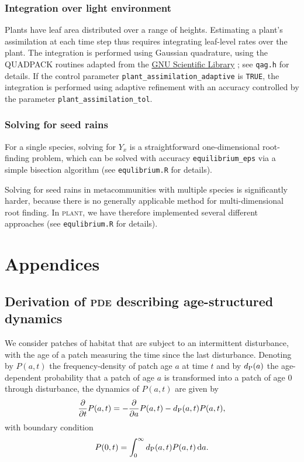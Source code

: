 \documentclass[10pt,twoside]{article}
\newcommand{\plant}{\textsc{plant}}
\begin{document}
\subsubsection{Integration over light
environment}\label{integrating-over-light-environment}

Plants have leaf area distributed over a range of heights. Estimating
a plant's assimilation at each time step thus requires integrating
leaf-level rates over the plant. The integration is performed using
Gaussian quadrature, using the QUADPACK routines \citep{Piessens-1983}
adapted from the \href{http://www.gnu.org/software/gsl/}{GNU Scientific
Library} \citep{Galassi-2009}; see \texttt{qag.h} for details.
If the control parameter \texttt{plant\_assimilation\_adaptive} is \texttt{TRUE},
the integration is performed using adaptive refinement with an accuracy
controlled by the parameter \texttt{plant\_assimilation\_tol}.

\subsubsection{Solving for seed
rains}\label{solving-demographic-seed-rain}

For a single species, solving for \(Y_x\) is a straightforward
one-dimensional root-finding problem, which can be solved with accuracy
\texttt{equilibrium\_eps} via a simple bisection algorithm (see
\texttt{equlibrium.R} for details).

Solving for seed rains in metacommunities with multiple species is significantly harder,
because there is no generally applicable method for multi-dimensional root finding. In {\plant}, we
have therefore implemented several different approaches (see
\texttt{equlibrium.R} for details).

\section{Appendices}\label{appendices}

\subsection{Derivation of \textsc{pde} describing age-structured
dynamics}\label{derivation-of-pde-describing-age-structured-dynamics}

We consider patches of habitat that are subject to an intermittent
disturbance, with the age of a patch measuring the time
since the last disturbance. Denoting by \(P(a, t)\) the frequency-density of
patch age \(a\) at time \(t\) and by \(d_{\rm P}(a)\) the
age-dependent probability that a patch of age \(a\) is transformed into
a patch of age \(0\) through disturbance, the dynamics of \(P(a, t)\) are given by
\[ \frac{\partial}{\partial t} P(a, t) = -\frac{\partial}{\partial a} P(a, t)-d_{\rm P}(a, t) P(a, t),\]
with boundary condition
\[ P(0, t) = \int^{\infty}_{0}d_{\rm P}(a, t) P(a, t) \, {\rm d}a.\]
\end{document}
